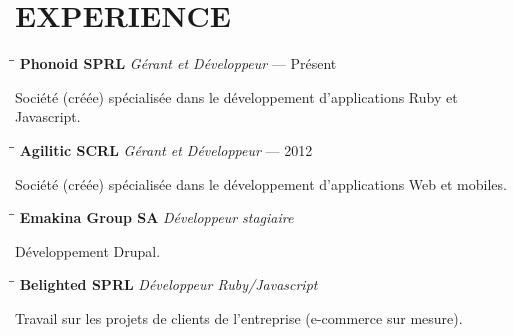 \section{EXPERIENCE}

\vspace{0.50cm}


\begin{tabbing}
  \hspace{2.3in}\= \hspace{2.6in}\= \kill
  \textbf{Phonoid SPRL} \>\emph{Gérant et Développeur}  — Présent\\
\end{tabbing}\vspace{-30pt}

Société (créée) spécialisée dans le développement d’applications Ruby et Javascript.


\begin{tabbing}
  \hspace{2.3in}\= \hspace{2.6in}\= \kill
  \textbf{Agilitic SCRL} \>\emph{Gérant et Développeur}  — 2012\\
\end{tabbing}\vspace{-30pt}

Société (créée) spécialisée dans le développement d’applications Web et mobiles.


\begin{tabbing}
  \hspace{2.3in}\= \hspace{2.6in}\= \kill
  \textbf{Emakina Group SA} \>\emph{Développeur stagiaire} \\
\end{tabbing}\vspace{-30pt}

Développement Drupal.


\begin{tabbing}
  \hspace{2.3in}\= \hspace{2.6in}\= \kill
  \textbf{Belighted SPRL} \>\emph{Développeur Ruby/Javascript} \\
\end{tabbing}\vspace{-30pt}

Travail sur les projets de clients de l'entreprise (e-commerce sur mesure).

